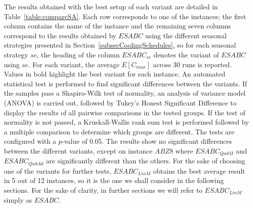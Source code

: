 \documentclass[icae]{iosart2x}
\newcommand{\reviewed}[1]{#1} %
\begin{document}
The results obtained with the best setup of each \reviewed{variant} are detailed in Table~\ref{table:compareSA}. \reviewed{Each row corresponds to one of the instances; the first column contains the name of the instance and the remaining seven columns correspond to the results obtained by $ESABC$ using the different seasonal strategies presented in Section~\ref{subsecCoolingSchedules}, so for each seasonal strategy $se$, the heading of the column $ESABC_{se}$ denotes the variant of $ESABC$ using $se$. For each variant, the average $E[C_{max}]$ across 30 runs is reported.} Values in bold highlight the best variant for each instance.  \reviewed{An automated statistical test is performed to find significant differences between the variants. If the samples pass a Shapiro-Wilk test of normality, an analysis of variance model (ANOVA) is carried out, followed by Tukey's Honest Significant Difference to display the results of all pairwise comparisons in the tested groups. If the test of normality is not passed, a Kruskall-Wallis rank sum test is performed followed by a multiple comparison to determine which groups are different. The tests are configured with a $p$-value of 0.05. The results show} no significant differences between the different variants, except on instance $ABZ8$ where $ESABC_{QadM}$ and $ESABC_{QadAd}$ are significantly different than the others. For the sake of choosing one of the variants for further tests, $ESABC_{LinM}$ obtains the best average result in 5 out of 12 instances, so it is the one we shall consider in the following sections. For the sake of clarity, in further sections we will refer to $ESABC_{LinM}$ simply as $ESABC$.
\end{document}
